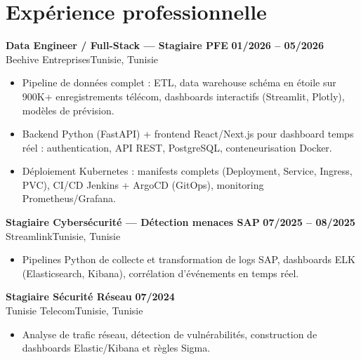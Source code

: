 \documentclass[a4paper,10pt]{article}
\newcommand{\cventry}[4]{\textbf{#1} \hfill \textbf{#4}\\[1pt]#2{\ifx\relax#3\relax\else, #3\fi}\par\vspace{1pt}}
\begin{document}
\section{Expérience professionnelle}
\cventry{Data Engineer / Full-Stack --- Stagiaire PFE}{Beehive Entreprises}{Tunisie}{01/2026 -- 05/2026}
\begin{itemize}
  \item Pipeline de données complet : ETL, data warehouse schéma en étoile sur 900K+ enregistrements télécom, dashboards interactifs (Streamlit, Plotly), modèles de prévision.
  \item Backend Python (FastAPI) + frontend React/Next.js pour dashboard temps réel : authentication, API REST, PostgreSQL, conteneurisation Docker.
  \item Déploiement Kubernetes : manifests complets (Deployment, Service, Ingress, PVC), CI/CD Jenkins + ArgoCD (GitOps), monitoring Prometheus/Grafana.
\end{itemize}
\cventry{Stagiaire Cybersécurité --- Détection menaces SAP}{Streamlink}{Tunisie}{07/2025 -- 08/2025}
\begin{itemize}
  \item Pipelines Python de collecte et transformation de logs SAP, dashboards ELK (Elasticsearch, Kibana), corrélation d'événements en temps réel.
\end{itemize}
\cventry{Stagiaire Sécurité Réseau}{Tunisie Telecom}{Tunisie}{07/2024}
\begin{itemize}
  \item Analyse de trafic réseau, détection de vulnérabilités, construction de dashboards Elastic/Kibana et règles Sigma.
\end{itemize}
\end{document}
